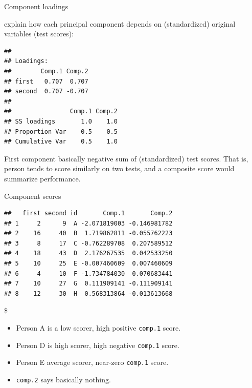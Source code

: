 \documentclass[ignorenonframetext,]{beamer}
\newenvironment{Shaded}{\begin{snugshade}}{\end{snugshade}}
\newcommand{\KeywordTok}[1]{\textcolor[rgb]{0.13,0.29,0.53}{\textbf{#1}}}
\newcommand{\NormalTok}[1]{#1}
\newcommand{\OperatorTok}[1]{\textcolor[rgb]{0.81,0.36,0.00}{\textbf{#1}}}
\newcommand{\StringTok}[1]{\textcolor[rgb]{0.31,0.60,0.02}{#1}}
\begin{document}
\begin{frame}[fragile]{Component loadings}
\protect\hypertarget{component-loadings}{}

explain how each principal component depends on (standardized) original
variables (test scores):

\begin{Shaded}
\end{Shaded}

\begin{verbatim}
## 
## Loadings:
##        Comp.1 Comp.2
## first   0.707  0.707
## second  0.707 -0.707
## 
##                Comp.1 Comp.2
## SS loadings       1.0    1.0
## Proportion Var    0.5    0.5
## Cumulative Var    0.5    1.0
\end{verbatim}

First component basically negative sum of (standardized) test scores.
That is, person tends to score similarly on two tests, and a composite
score would summarize performance.

\end{frame}

\begin{frame}[fragile]{Component scores}
\protect\hypertarget{component-scores}{}

\begin{Shaded}
\end{Shaded}

\begin{verbatim}
##   first second id       Comp.1       Comp.2
## 1     2      9  A -2.071819003 -0.146981782
## 2    16     40  B  1.719862811 -0.055762223
## 3     8     17  C -0.762289708  0.207589512
## 4    18     43  D  2.176267535  0.042533250
## 5    10     25  E -0.007460609  0.007460609
## 6     4     10  F -1.734784030  0.070683441
## 7    10     27  G  0.111909141 -0.111909141
## 8    12     30  H  0.568313864 -0.013613668
\end{verbatim}

\$

\begin{itemize}
\item
  Person A is a low scorer, high positive \texttt{comp.1} score.
\item
  Person D is high scorer, high negative \texttt{comp.1} score.
\item
  Person E average scorer, near-zero \texttt{comp.1} score.
\item
  \texttt{comp.2} says basically nothing.
\end{itemize}

\end{frame}
\end{document}
